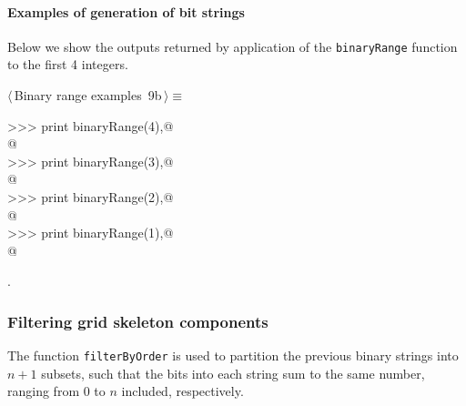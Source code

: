 \documentclass[11pt,oneside]{article}	%
\begin{document}
\paragraph{Examples of generation of bit strings}
Below we show the outputs returned by application of the \texttt{binaryRange} function to the first 4 integers.
\begin{flushleft} \small \label{scrap12}
\protect{}$\langle\,$Binary range examples\nobreak\ {\footnotesize 9b}$\,\rangle\equiv$
\vspace{-1ex}
\begin{list}{}{} \item
\mbox{}\verb@>>> print binaryRange(4),@\\
\mbox{}@\\
\mbox{}\verb@>>> print binaryRange(3),@\\
\mbox{}\verb@['000', '001', '010', '011', '100', '101', '110', '111']@\\
\mbox{}\verb@>>> print binaryRange(2),@\\
\mbox{}\verb@['00', '01', '10', '11']@\\
\mbox{}\verb@>>> print binaryRange(1),@\\
\mbox{}\verb@['0', '1']@\\
\mbox{}\verb@@{\NWsep}
\end{list}
\vspace{-1ex}
\footnotesize\addtolength{\baselineskip}{-1ex}
\begin{list}{}{\setlength{\itemsep}{-\parsep}\setlength{\itemindent}{-\leftmargin}}
\item {\NWtxtMacroNoRef}.
\end{list}
\end{flushleft}

\subsubsection{Filtering grid skeleton components}
\label{sec:filterByOrder}

The function \texttt{filterByOrder} is used to partition the previous binary strings into $n+1$ subsets, such that the bits into each string sum to the same number, ranging from 0 to $n$ included, respectively.
\end{document}
